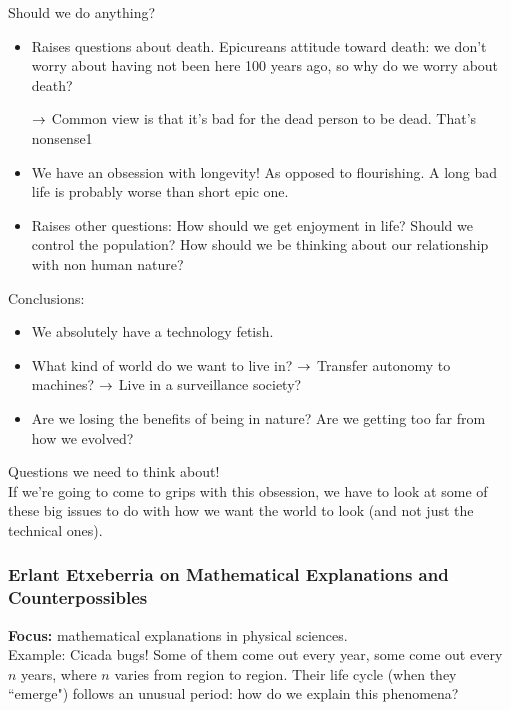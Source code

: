 Should we do anything?
\begin{itemize}
\item Raises questions about death. Epicureans attitude toward death: we don't worry about having not been here 100 years ago, so why do we worry about death?

$\rightarrow$ Common view is that it's bad for the dead person to be dead. That's nonsense1

\item We have an obsession with longevity! As opposed to flourishing. A long bad life is probably worse than short epic one.

\item Raises other questions: How should we get enjoyment in life? Should we control the population? How should we be thinking about our relationship with non human nature?
\end{itemize}

Conclusions:
\begin{itemize}
	\item We absolutely have a technology fetish.
	\item What kind of world do we want to live in?
	$\rightarrow$ Transfer autonomy to machines?
	$\rightarrow$ Live in a surveillance society?
	\item Are we losing the benefits of being in nature? Are we getting too far from how we evolved?
	\end{itemize}
Questions we need to think about! \\

If we're going to come to grips with this obsession, we have to look at some of these big issues to do with how we want the world to look (and not just the technical ones).


\spacerule


\subsubsection{Erlant Etxeberria on Mathematical Explanations and Counterpossibles}

{\bf Focus:} mathematical explanations in physical sciences. \\

Example: Cicada bugs! Some of them come out every year, some come out every $n$ years, where $n$ varies from region to region. Their life cycle (when they ``emerge") follows an unusual period: how do we explain this phenomena? \\

